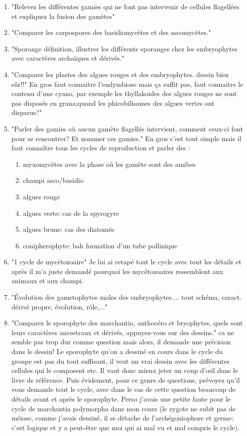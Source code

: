 \begin{enumerate}
	\item "Relevez les différentes gamies qui ne font pas intervenir de cellules flagellées et expliquez la fusion des gamètes"

	\item "Comparer les carpospores des basidiomycètes et des ascomycètes."

	\item "Sporange définition, illustrer les différents sporanges chez les embryophytes avec caractères archaïques et dérivés."

	\item "Comparer les plastes des algues rouges et des embryophytes. dessin bien sûr!!" En gros faut connaitre l’endymbiose mais ça suffit pas, faut connaitre le contenu d’une cyano, par exemple les thyllakoides des algues rouges ne sont pas disposés en grana;quand les phicobilisomes des algues vertes ont disparus?"

	\item "Parler des gamies où aucun gamète flagellés intervient, comment ceux-ci font pour se rencontrer? Et nommer ces gamies." En gros c'est tout simple mais il faut connaître tous les cycles de reproduction et parler des :
	\begin{enumerate}
		\item myxomycètes avec la phase où les gamète sont des amibes
		\item champi asco/basidio
		\item algues rouge
		\item algues verte: cas de la spyrogyre
		\item algues brune: cas des diatomés
		\item conipherophyte: bah formation d’un tube pollinique
	\end{enumerate}

	\item "1 cycle de mycétozoaire" Je lui ai retapé tout le cycle avec tout les détails et après il m'a juste demandé pourquoi les mycétozoaires ressemblent aux animaux et aux champi.

	\item "Évolution des gametophytes males des embryophytes.... tout schéma, caract. dérivé propre, évolution, rôle,..."

	\item "Comparez le sporophyte des marchantio, anthocéro et bryophytes, quels sont leurs caractères ancestraux et dérivés, appuyez-vous sur des dessins."
ca ne semble pas trop dur comme question mais alors, il demande une précision dans le dessin! Le sporophyte qu’on a dessiné en cours dans le cycle du groupe est pas du tout suffisant, il veut un vrai dessin avec les différentes cellules qui le composent etc. Il vaut donc mieux jeter un coup d'œil dans le livre de référence. Puis évidement, pour ce genre de questions, prévoyez qu'il vous demande tout le cycle, avec dans le cas de cette question beaucoup de détails avant et après le sporophyte. Perso j'avais une petite faute pour le cycle de marchantia polymorpha dans mon cours (le zygote ne subit pas de méiose, comme j'avais dessiné, il se détache de l'archégoniophore et germe: c'est logique et y a peut-être que moi qui ai mal vu et mal compris le cycle).


\end{enumerate}
